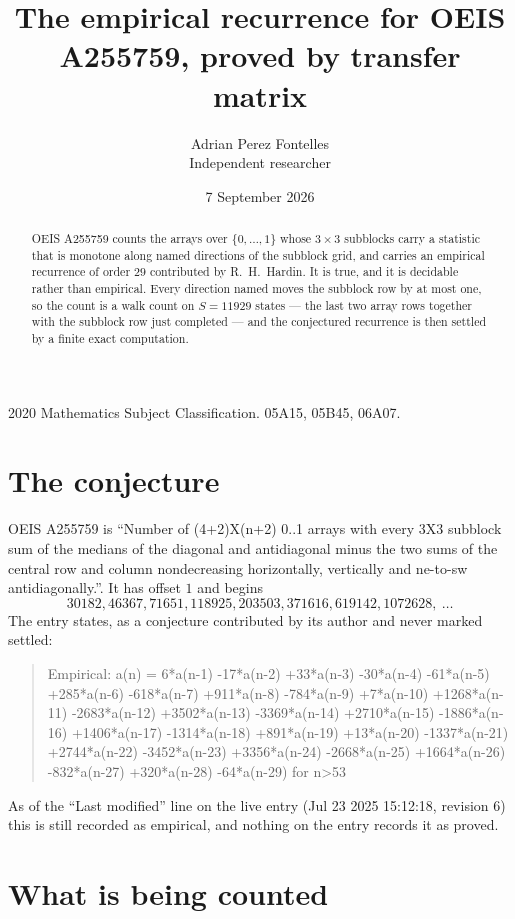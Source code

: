 \documentclass[11pt,a4paper]{article}
\title{The empirical recurrence for OEIS A255759, proved by transfer matrix}
\author{Adrian Perez Fontelles\\ \small Independent researcher}
\date{7 September 2026}
\theoremstyle{plain}
\theoremstyle{definition}
\begin{document}
\maketitle

\begin{abstract}
OEIS A255759 counts the arrays over $\{0,\dots,1\}$ whose $3\times3$ subblocks carry a
statistic that is monotone along named directions of the subblock grid, and carries an
empirical recurrence of order $29$ contributed by R.~H.~Hardin. It is true, and it is
decidable rather than empirical. Every direction named moves the subblock row by at most one,
so the count is a walk count on $S=11929$ states --- the last two array rows together with the
subblock row just completed --- and the conjectured recurrence is then settled by a finite
exact computation.
\end{abstract}

\noindent\small 2020 Mathematics Subject Classification. 05A15, 05B45, 06A07.\normalsize

\section{The conjecture}

OEIS A255759 is ``Number of (4+2)X(n+2) 0..1 arrays with every 3X3 subblock sum of the medians of the diagonal and antidiagonal minus the two sums of the central row and column nondecreasing horizontally, vertically and ne-to-sw antidiagonally.''. It has offset $1$ and begins
\[
30182, 46367, 71651, 118925, 203503, 371616, 619142, 1072628,\ \dots
\]
The entry states, as a conjecture contributed by its author and never marked settled:
\begin{quote}
Empirical: a(n) = 6*a(n-1) -17*a(n-2) +33*a(n-3) -30*a(n-4) -61*a(n-5) +285*a(n-6) -618*a(n-7) +911*a(n-8) -784*a(n-9) +7*a(n-10) +1268*a(n-11) -2683*a(n-12) +3502*a(n-13) -3369*a(n-14) +2710*a(n-15) -1886*a(n-16) +1406*a(n-17) -1314*a(n-18) +891*a(n-19) +13*a(n-20) -1337*a(n-21) +2744*a(n-22) -3452*a(n-23) +3356*a(n-24) -2668*a(n-25) +1664*a(n-26) -832*a(n-27) +320*a(n-28) -64*a(n-29) for n>53
\end{quote}
As of the ``Last modified'' line on the live entry (Jul 23 2025 15:12:18, revision 6) this is still
recorded as empirical, and nothing on the entry records it as proved.

\section{What is being counted}
\end{document}
